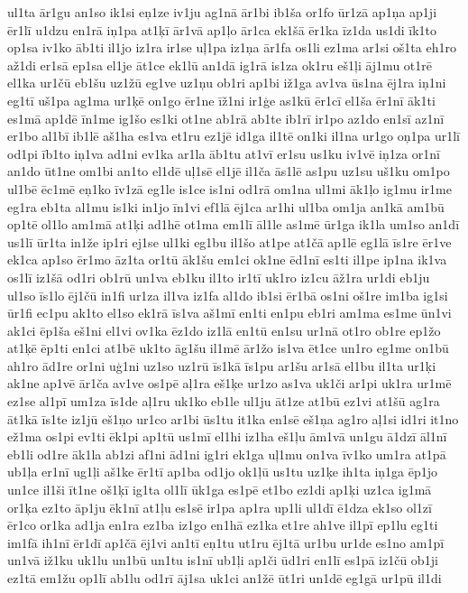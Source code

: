 {ul1ta
ār1gu
an1so
ik1si
eņ1ze
iv1ju
ag1nā
ār1bi
ib1ša
or1fo
ūr1zā
ap1ņa
ap1ji
ēr1lī
u1dzu
en1rā
iņ1pa
at1ķī
ār1vā
ap1ļo
ār1ca
ek1šā
ēr1ka
īz1da
us1di
īk1to
op1sa
iv1ko
āb1ti
il1jo
iz1ra
ir1se
uļ1pa
iz1ņa
ār1fa
os1li
ez1ma
ar1si
oš1ta
eh1ro
až1di
er1sā
ep1sa
el1je
āt1ce
ek1lū
an1dā
ig1rā
is1za
ok1ru
eš1ļi
āj1mu
ot1rē
el1ka
ur1čū
eb1šu
uz1žū
eg1ve
uz1ņu
ob1ri
ap1bi
iž1ga
av1va
ūs1na
ēj1ra
iņ1ni
eg1tī
uš1pa
ag1ma
ur1ķē
on1go
ēr1ne
īž1ni
ir1ģe
as1kū
ēr1cī
el1ša
ēr1nī
āk1ti
es1mā
ap1dē
īn1me
ig1šo
es1ki
ot1ne
ab1rā
ab1te
ib1rī
ir1po
az1do
en1sī
az1nī
er1bo
al1bī
ib1lē
aš1ha
es1va
et1ru
ez1jē
id1ga
il1tē
on1ki
il1na
ur1go
oņ1pa
ur1lī
od1pi
īb1to
iņ1va
ad1ni
ev1ka
ar1la
āb1tu
at1vī
er1su
us1ku
iv1vē
iņ1za
or1nī
an1do
ūt1ne
om1bi
an1to
el1dē
uļ1sē
el1jē
il1ča
ās1lē
as1pu
uz1su
uš1ku
om1po
ul1bē
ēc1mē
eņ1ko
īv1zā
eg1le
is1ce
is1ni
od1rā
om1na
ul1mi
āk1ļo
ig1mu
ir1me
eg1ra
eb1ta
al1mu
is1ki
in1jo
īn1vi
ef1lā
ēj1ca
ar1hi
ul1ba
om1ja
an1kā
am1bū
op1tē
ol1lo
am1mā
at1ķi
ad1hē
ot1ma
em1lī
āl1le
as1mē
ūr1ga
ik1la
um1so
an1dī
us1lī
ūr1ta
in1že
ip1ri
ej1se
ul1ki
eg1bu
il1šo
at1pe
at1čā
ap1lē
eg1lā
īs1re
ēr1ve
ek1ca
ap1so
ēr1mo
āz1ta
or1tū
āk1šu
em1ci
ok1ne
ēd1nī
es1ti
il1pe
ip1na
ik1va
os1lī
iz1šā
od1ri
ob1rū
un1va
eb1ku
il1to
ir1tī
uk1ro
iz1cu
āž1ra
ur1di
eb1ju
ul1so
īs1lo
ēj1čū
in1fi
ur1za
il1va
iz1fa
al1do
ib1si
ēr1bā
os1ni
oš1re
im1ba
ig1si
ūr1fi
ec1pu
ak1to
el1so
ek1rā
īs1va
aš1mī
en1ti
en1pu
eb1ri
am1ma
es1me
ūn1vi
ak1ci
ēp1ša
eš1ni
el1vi
ov1ka
ēz1do
iz1lā
en1tū
en1su
ur1nā
ot1ro
ob1re
ep1žo
at1ķē
ēp1ti
en1ci
at1bē
uk1to
āg1šu
il1mē
ār1žo
is1va
ēt1ce
un1ro
eg1me
on1bū
ah1ro
ād1re
or1ni
uģ1ni
uz1so
uz1rū
īs1kā
īs1pu
ar1šu
ar1sā
el1bu
il1ta
ur1ķi
ak1ne
ap1vē
ār1ča
av1ve
os1pē
aļ1ra
eš1ķe
ur1zo
as1va
uk1či
ar1pi
uk1ra
ur1mē
ez1se
al1pī
um1za
īs1de
aļ1ru
uk1ko
eb1le
ul1ju
āt1ze
at1bū
ez1vi
at1šū
ag1ra
āt1kā
īs1te
iz1jū
eš1ņo
ur1co
ar1bi
ūs1tu
it1ka
en1sē
eš1ņa
ag1ro
aļ1si
id1ri
it1no
ež1ma
os1pi
ev1ti
ēk1pi
ap1tū
us1mī
el1hi
iz1ha
eš1ļu
ām1vā
un1gu
ā1dzī
āl1nī
eb1li
od1re
āk1la
ab1zi
af1ni
ād1ni
ig1ri
ek1ga
uļ1mu
on1va
īv1ko
um1ra
at1pā
ub1ļa
er1nī
ug1ļi
aš1ke
ēr1tī
ap1ba
od1jo
ok1ļū
us1tu
uz1ķe
ih1ta
iņ1ga
ēp1jo
un1ce
il1ši
īt1ne
oš1ķī
ig1ta
ol1lī
ūk1ga
es1pē
et1bo
ez1di
ap1ķi
uz1ca
ig1mā
or1ķa
ez1to
āp1ju
ēk1nī
at1ļu
es1sē
ir1pa
ap1ra
up1li
ul1dī
ē1dza
ek1so
ol1zī
ēr1co
or1ka
ad1ja
en1ra
ez1ba
iz1go
en1hā
ez1ka
et1re
ah1ve
il1pī
ep1lu
eg1ti
im1fā
ih1nī
ēr1dī
ap1čā
ēj1vi
an1tī
eņ1tu
ut1ru
ēj1tā
ur1bu
ur1de
es1no
am1pī
un1vā
iž1ku
uk1lu
un1bū
un1tu
is1nī
ub1ļi
ap1či
ūd1ri
en1lī
es1pā
iz1čū
ob1ji
ez1tā
em1žu
op1lī
ab1lu
od1rī
āj1sa
uk1ci
an1žē
ūt1ri
un1dē
eg1gā
ur1pū
il1di
}
